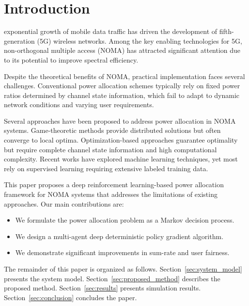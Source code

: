 \documentclass[journal]{IEEEtran}
\begin{document}

\section{Introduction}
\label{sec:introduction}

 exponential growth of mobile data traffic has driven the
development of fifth-generation (5G) wireless networks. Among the key enabling
technologies for 5G, non-orthogonal multiple access (NOMA) has attracted
significant attention due to its potential to improve spectral efficiency.

Despite the theoretical benefits of NOMA, practical implementation faces several
challenges. Conventional power allocation schemes typically rely on fixed power
ratios determined by channel state information, which fail to adapt to dynamic
network conditions and varying user requirements.

Several approaches have been proposed to address power allocation in NOMA
systems. Game-theoretic methods provide distributed solutions but often
converge to local optima. Optimization-based approaches guarantee optimality
but require complete channel state information and high computational
complexity. Recent works have explored machine learning techniques, yet most
rely on supervised learning requiring extensive labeled training data.

This paper proposes a deep reinforcement learning-based power allocation
framework for NOMA systems that addresses the limitations of existing approaches.
Our main contributions are:
\begin{itemize}
    \item We formulate the power allocation problem as a Markov decision process.
    \item We design a multi-agent deep deterministic policy gradient algorithm.
    \item We demonstrate significant improvements in sum-rate and user fairness.
\end{itemize}

The remainder of this paper is organized as follows. Section~\ref{sec:system_model}
presents the system model. Section~\ref{sec:proposed_method} describes the
proposed method. Section~\ref{sec:results} presents simulation results.
Section~\ref{sec:conclusion} concludes the paper.
\end{document}
